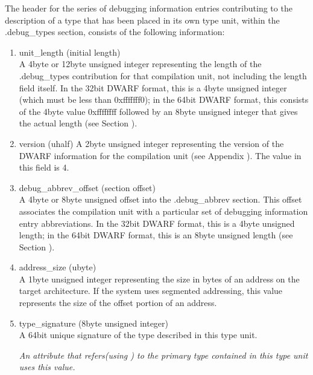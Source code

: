 The header for the series of debugging information entries
contributing to the description of a type that has been
placed in its own type unit, within the .debug\_types section,
consists of the following information:

\begin{enumerate}[1.]

\item unit\_length (initial length) \\
A 4\dash byte or 12\dash byte unsigned integer representing the length
of the .debug\_types contribution for that compilation unit,
not including the length field itself. In the 32\dash bit DWARF
format, this is a 4\dash byte unsigned integer (which must be
less than 0xfffffff0); in the 64\dash bit DWARF format, this
consists of the 4\dash byte value 0xffffffff followed by an 
8\dash byte unsigned integer that gives the actual length
(see Section ).

\item  version (uhalf)
A 2\dash byte unsigned integer representing the version of the
DWARF information for the compilation unit 
(see Appendix ). 
The value in this field is 4.

\item debug\_abbrev\_offset (section offset) \\
A 4\dash byte or 8\dash byte unsigned offset into the .debug\_abbrev
section. This offset associates the compilation unit with a
particular set of debugging information entry abbreviations. In
the 32\dash bit DWARF format, this is a 4\dash byte unsigned length;
in the 64\dash bit DWARF format, this is an 8\dash byte unsigned length
(see Section ).

\item address\_size (ubyte) \\
A 1\dash byte unsigned integer representing the size in bytes of
an address on the target architecture. If the system uses
segmented addressing, this value represents the size of the
offset portion of an address.


\item type\_signature (8\dash byte unsigned integer) \\
A 64\dash bit unique signature of the type described in this type
unit.  

\textit{An attribute that refers(using ) to
the primary type contained in this type unit uses this value.}



\end{enumerate}
